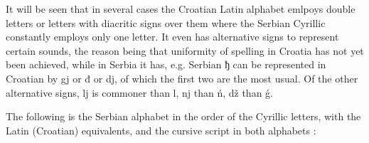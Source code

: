         It will be seen that in several cases the Croatian Latin alphabet
        emlpoys double letters or letters with diacritic signs over them where
        the Serbian Cyrillic constantly employs only one letter.
        It even has alternative signs to represent certain sounds, the reason
        being that uniformity of spelling in Croatia has not yet been achieved,
        while in Serbia it has, e.g. Serbian ђ can be represented
        in Croatian by gj or đ or dj, of which the first two are the most
        usual. Of the other alternative signs, lj is commoner than l, nj than
        ń, dž than ǵ.
        
        The following is the Serbian alphabet in the order of the Cyrillic
        letters, with the Latin (Croatian) equivalents, and the cursive script
        in both alphabets :
        \newpage
        

